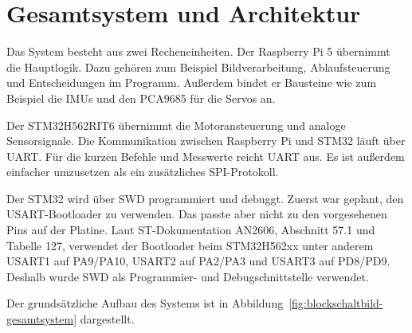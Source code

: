 \newpage
\section{Gesamtsystem und Architektur}
Das System besteht aus zwei Recheneinheiten. Der Raspberry Pi 5 übernimmt die Hauptlogik. Dazu gehören zum Beispiel Bildverarbeitung, Ablaufsteuerung und Entscheidungen im Programm. Außerdem bindet er Bausteine wie zum Beispiel die IMUs und den PCA9685 für die Servos an.

Der STM32H562RIT6 übernimmt die Motoransteuerung und analoge Sensorsignale. Die Kommunikation zwischen Raspberry Pi und STM32 läuft über UART. Für die kurzen Befehle und Messwerte reicht UART aus. Es ist außerdem einfacher umzusetzen als ein zusätzliches SPI-Protokoll.

Der STM32 wird über SWD programmiert und debuggt. Zuerst war geplant, den USART-Bootloader zu verwenden. Das passte aber nicht zu den vorgesehenen Pins auf der Platine. Laut ST-Dokumentation AN2606, Abschnitt 57.1 und Tabelle 127, verwendet der Bootloader beim STM32H562xx unter anderem USART1 auf PA9/PA10, USART2 auf PA2/PA3 und USART3 auf PD8/PD9. Deshalb wurde SWD als Programmier- und Debugschnittstelle verwendet.

Der grundsätzliche Aufbau des Systems ist in Abbildung~\ref{fig:blockschaltbild-gesamtsystem} dargestellt.

